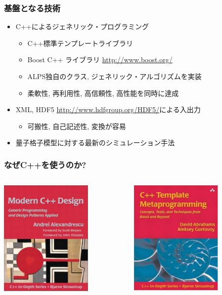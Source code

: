 \begin{frame}
  \frametitle{基盤となる技術}
  \begin{itemize}
    \setlength{\itemsep}{1em}
  \item C++によるジェネリック・プログラミング
    \begin{itemize}
    \item C++標準テンプレートライブラリ
    \item Boost C++ ライブラリ \url{http://www.boost.org/}
    \item ALPS独自のクラス, ジェネリック・アルゴリズムを実装
    \item 柔軟性, 再利用性, 高信頼性, 高性能を同時に達成
    \end{itemize}
  \item XML, HDF5 \url{http://www.hdfgroup.org/HDF5/}による入出力
    \begin{itemize}
    \item 可搬性, 自己記述性, 変換が容易
    \end{itemize}
  \item 量子格子模型に対する最新のシミュレーション手法
  \end{itemize}
\end{frame}

\begin{frame}
  \frametitle{なぜC++を使うのか?}
  \begin{columns}[T]
    \begin{column}{.5\textwidth}
      \centering \includegraphics[width=4.5cm]{modern-cxx.pdf}
    \end{column}
    \begin{column}{.5\textwidth}
      \centering \includegraphics[width=4.5cm]{cxx-template.pdf}
    \end{column}
  \end{columns}
\end{frame}

